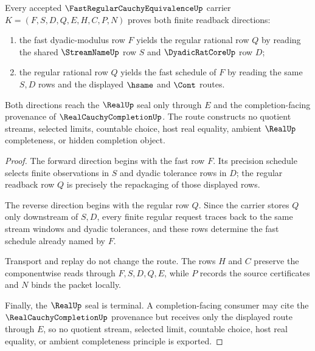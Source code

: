 \begin{theorem}
\label{thm:fast-cauchy-regular-equivalence-two-way-route}
Every accepted $\FastRegularCauchyEquivalenceUp$ carrier $K=(F,S,D,Q,E,H,C,P,N)$ proves both finite readback directions:
\begin{enumerate}
\item the fast dyadic-modulus row $F$ yields the regular rational row $Q$ by reading the shared $\StreamNameUp$ row $S$ and $\DyadicRatCoreUp$ row $D$;
\item the regular rational row $Q$ yields the fast schedule of $F$ by reading the same $S,D$ rows and the displayed $\hsame$ and $\Cont$ routes.
\end{enumerate}
Both directions reach the $\RealUp$ seal only through $E$ and the completion-facing provenance of $\RealCauchyCompletionUp$. The route constructs no quotient streams, selected limits, countable choice, host real equality, ambient $\RealUp$ completeness, or hidden completion object.
\end{theorem}
\begin{proof}
The forward direction begins with the fast row $F$. Its precision schedule selects finite observations in $S$ and dyadic tolerance rows in $D$; the regular readback row $Q$ is precisely the repackaging of those displayed rows.

The reverse direction begins with the regular row $Q$. Since the carrier stores $Q$ only downstream of $S,D$, every finite regular request traces back to the same stream windows and dyadic tolerances, and these rows determine the fast schedule already named by $F$.

Transport and replay do not change the route. The rows $H$ and $C$ preserve the componentwise reads through $F,S,D,Q,E$, while $P$ records the source certificates and $N$ binds the packet locally.

Finally, the $\RealUp$ seal is terminal. A completion-facing consumer may cite the $\RealCauchyCompletionUp$ provenance but receives only the displayed route through $E$, so no quotient stream, selected limit, countable choice, host real equality, or ambient completeness principle is exported.
\end{proof}


